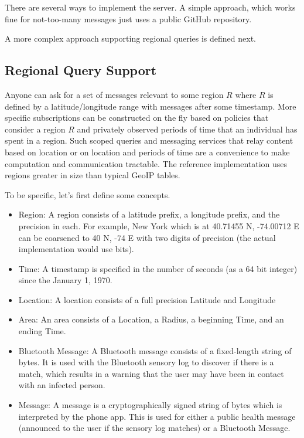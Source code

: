 \documentclass{article}
\begin{document}
There are several ways to implement the server.  A simple approach, which works fine for not-too-many messages just uses a public GitHub repository.

A more complex approach supporting regional queries is defined next.  

\subsection{Regional Query Support}
Anyone can ask for a set of messages relevant to some region $R$ where $R$ is defined by a latitude/longitude range with messages after some timestamp.  More specific subscriptions can be constructed on the fly based on policies that consider a region $R$ and privately observed periods of time that an individual has spent in a region. Such scoped queries and messaging services that relay content based on location or on location and periods of time are a convenience to make computation and communication tractable.  The reference implementation uses regions greater in size than typical GeoIP tables.

To be specific, let's first define some concepts.
\begin{itemize}
    \item Region: A region consists of a latitude prefix, a longitude prefix, and the precision in each.  For example, New York which is at 40.71455 N, -74.00712 E can be coarsened to 40 N, -74 E with two digits of precision (the actual implementation would use bits).
    \item Time: A timestamp is specified in the number of seconds (as a 64 bit integer) since the January 1, 1970. 
    \item Location: A location consists of a full precision Latitude and Longitude
    \item Area: An area consists of a Location, a Radius, a beginning Time, and an ending Time.
    \item Bluetooth Message: A Bluetooth message consists of a fixed-length string of bytes.  It is used with the Bluetooth sensory log to discover if there is a match, which results in a warning that the user may have been in contact with an infected person.  
    \item Message: A message is a cryptographically signed string of bytes which is interpreted by the phone app. This is used for either a public health message (announced to the user if the sensory log matches) or a Bluetooth Message. 
\end{itemize}
\end{document}
